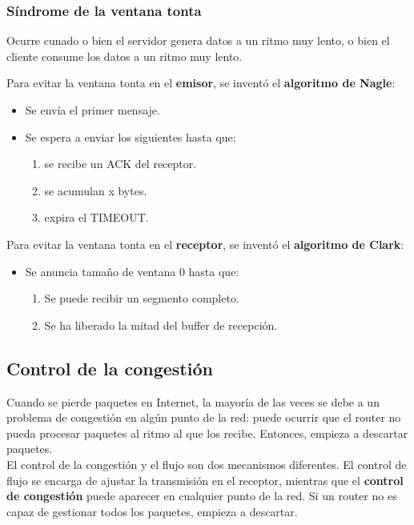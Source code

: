 \newpage
\subsubsection{Síndrome de la ventana tonta}
Ocurre cunado o bien el servidor genera datos a un ritmo muy lento, o bien el cliente consume los datos a un ritmo muy lento.\\
\begin{tcolorbox}[colback=white]
Para evitar la ventana tonta en el \textbf{emisor}, se inventó el \textbf{algoritmo de Nagle}:
\begin{itemize}
    \item Se envía el primer mensaje.
    \item Se espera a enviar los siguientes hasta que:
    \begin{enumerate}
        \item se recibe un ACK del receptor.
        \item se acumulan x bytes.
        \item expira el TIMEOUT.
    \end{enumerate}
\end{itemize}
\end{tcolorbox}
\begin{tcolorbox}[colback=white]
Para evitar la ventana tonta en el \textbf{receptor}, se inventó el \textbf{algoritmo de Clark}:
\begin{itemize}
    \item Se anuncia tamaño de ventana 0 hasta que:
    \begin{enumerate}
        \item Se puede recibir un segmento completo.
        \item Se ha liberado la mitad del buffer de recepción.
    \end{enumerate}
\end{itemize}
\end{tcolorbox}


\subsection{Control de la congestión}
Cuando se pierde paquetes en Internet, la mayoría de las veces se debe a un problema de congestión en algún punto de la red: puede ocurrir que el router no pueda procesar paquetes al ritmo al que los recibe. Entonces, empieza a descartar paquetes.\\

El control de la congestión y el flujo son dos mecanismos diferentes. El control de flujo se encarga de ajustar la transmisión en el receptor, mientras que el \textbf{control de congestión} puede aparecer en cualquier punto de la red. Si un router no es capaz de gestionar todos los paquetes, empieza a descartar.\\

